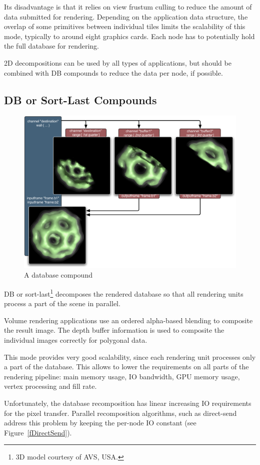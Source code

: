 \documentclass[10pt,a4]{scrartcl}
\newcommand{\fig}[1]{Figure~\ref{#1}}
\begin{document}
Its disadvantage is that it relies on view frustum culling to reduce the
amount of data submitted for rendering. Depending on the application
data structure, the overlap of some primitives between individual tiles
limits the scalability of this mode, typically to around eight graphics
cards. Each node has to potentially hold the full database for
rendering.

2D decompositions can be used by all types of applications, but should
be combined with DB compounds to reduce the data per node, if possible.


\subsection{DB or Sort-Last Compounds}

\begin{figure}
  \includegraphics[width=.618\textwidth]{images/DB.pdf}
  {\caption{\small A database compound}}
\end{figure}
DB or sort-last\footnote{3D model courtesy of AVS, USA.} decomposes the
rendered database so that all rendering units process a part of the
scene in parallel.

Volume rendering applications use an ordered alpha-based blending to
composite the result image. The depth buffer information is used to
composite the individual images correctly for polygonal data. 

This mode provides very good scalability, since each rendering unit
processes only a part of the database. This allows to lower the
requirements on all parts of the rendering pipeline: main memory usage,
IO bandwidth, GPU memory usage, vertex processing and fill rate.

Unfortunately, the database recomposition has linear increasing IO
requirements for the pixel transfer. Parallel recomposition algorithms,
such as direct-send address this problem by keeping the per-node IO
constant (see \fig{fDirectSend}).
\end{document}

